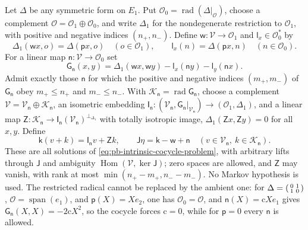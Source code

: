 Let \(\Delta\) be any symmetric form on \(E_1\). Put
\(\mathcal O_0=\operatorname{rad}(\Delta|_{\mathcal O})\), choose a complement
\(\mathcal O=\mathcal O_1\oplus\mathcal O_0\), and write \(\Delta_1\) for the nondegenerate
restriction to \(\mathcal O_1\), with positive and negative indices \((n_+,n_-)\). Define
\(\mathsf w:\mathcal V\to\mathcal O_1\) and \(\mathsf l_x\in\mathcal O_0^*\) by
\begin{equation}
\Delta_1(\mathsf wx,o)=\Delta(\mathsf px,o)\quad(o\in\mathcal O_1),\qquad
\mathsf l_x(n)=\Delta(\mathsf px,n)\quad(n\in\mathcal O_0).
\label{eq:pb-defect-signed-projection}
\end{equation}
For a linear map \(\mathsf n:\mathcal V\to\mathcal O_0\) set
\begin{equation}
\mathsf G_{\mathsf n}(x,y)=\Delta_1(\mathsf wx,\mathsf wy)-\mathsf l_x(\mathsf ny)-\mathsf l_y(\mathsf nx).
\label{eq:pb-defect-signed-budget}
\end{equation}
Admit exactly those \(\mathsf n\) for which the positive and negative indices \((m_+,m_-)\) of
\(\mathsf G_{\mathsf n}\) obey \(m_+\leq n_+\) and \(m_-\leq n_-\). With
\(\mathcal K_{\mathsf n}=\operatorname{rad}\mathsf G_{\mathsf n}\), choose a complement
\(\mathcal V=\mathcal V_{\mathsf n}\oplus\mathcal K_{\mathsf n}\), an isometric embedding
\(\mathsf I_{\mathsf n}:(\mathcal V_{\mathsf n},\mathsf G_{\mathsf n}|_{\mathcal V_{\mathsf n}})\to
(\mathcal O_1,\Delta_1)\), and a linear map
\(\mathsf Z:\mathcal K_{\mathsf n}\to\mathsf I_{\mathsf n}(\mathcal V_{\mathsf n})^{\perp_{\Delta_1}}\)
with totally isotropic image, \(\Delta_1(\mathsf Zx,\mathsf Zy)=0\) for all \(x,y\). Define
\begin{equation}
\mathsf k(v+k)=\mathsf I_{\mathsf n}v+\mathsf Zk,\qquad
\mathsf J\eta=\mathsf k-\mathsf w+\mathsf n
\quad(v\in\mathcal V_{\mathsf n},\ k\in\mathcal K_{\mathsf n}).
\label{eq:pb-defect-signed-parameterization}
\end{equation}
These are all solutions of \eqref{eq:pb-intrinsic-cocycle-problem}, with arbitrary lifts through
\(\mathsf J\) and ambiguity \(\operatorname{Hom}(\mathcal V,\ker\mathsf J)\); zero spaces are allowed, and
\(\mathsf Z\) may vanish, with rank at most \(\min(n_+-m_+,n_--m_-)\). No Markov hypothesis is used.
The restricted radical cannot be replaced by the ambient one: for
\(\Delta=\begin{psmallmatrix}0&1\\1&0\end{psmallmatrix}\), \(\mathcal O=\operatorname{span}(e_1)\), and
\(\mathsf p(X)=Xe_2\), one has \(\mathcal O_0=\mathcal O\), and \(\mathsf n(X)=\mathrm cXe_1\) gives
\(\mathsf G_{\mathsf n}(X,X)=-2\mathrm cX^2\), so the cocycle forces \(\mathrm c=0\), while for
\(\mathsf p=0\) every \(\mathsf n\) is allowed. 

